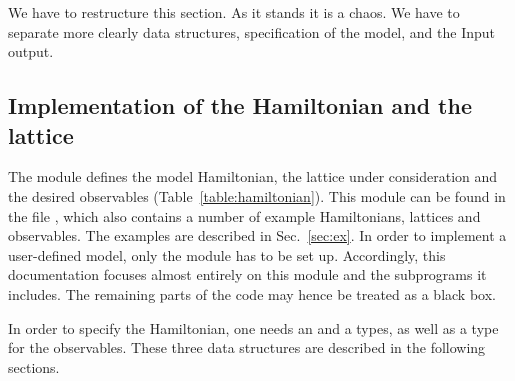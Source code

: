 

{\color{red}   We have to restructure this  section.   As it  stands it is a  chaos. We have to separate more clearly data structures, specification of the model, and  the Input output. }

\subsection{Implementation of the Hamiltonian and the lattice} 
\label{sec:hamiltonian}



The module  defines the model Hamiltonian, the lattice under consideration and the desired observables (Table~\ref{table:hamiltonian}). This module can be found in the file , which also contains a number of example Hamiltonians, lattices and observables.  The examples are described in Sec.~\ref{sec:ex}.
In order to implement a user-defined model, only the module  has to be set up. Accordingly, this documentation focuses almost entirely  on this module and the subprograms it includes.
The remaining parts of the code may hence be treated as a black box.  

In order to specify the Hamiltonian, one needs  an   and a  types, as well as a type for the observables. These three data structures are described in the following sections.

